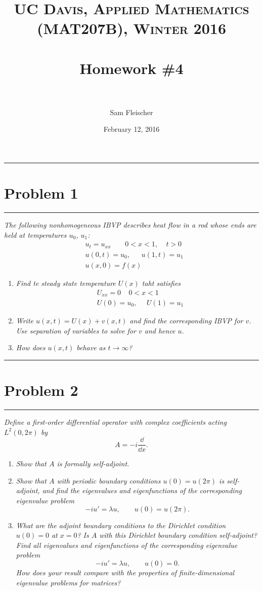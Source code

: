 \documentclass{article} %
\title{ 
\normalfont \normalsize 
\textsc{UC Davis, Applied Mathematics (MAT207B), Winter 2016} \\ [25pt] %
\horrule{2pt} \\[0.4cm] %
\Huge Homework \#4 \\ %
\horrule{2pt} \\[0.5cm] %
}
\author{\huge Sam Fleischer} %
\date{February 12, 2016} %
\theoremstyle{plain}
\newcommand{\problem}[1]{
\vspace{.375cm}
\begin{minipage}{\textwidth}
    \begin{center}
        \noindent\rule{5cm}{1pt}
    \end{center}
    \section{\bf #1}
    \begin{center}
        \noindent\rule{5cm}{1pt}
    \end{center}
    \vspace{0.25cm}
\end{minipage}
}
\numberwithin{equation}{section} %
\numberwithin{figure}{section} %
\numberwithin{table}{section} %
\begin{document}
\thispagestyle{empty}

\maketitle %

\makeatletter
{}
\makeatother

\pagebreak

\problem{Problem 1}
\emph{The following nonhomogeneous IBVP describes heat flow in a rod whose ends are held at temperatures $u_0$, $u_1$:}
\begin{align*}
    &u_t = u_{xx}\ \ \ \ \ \ \ \ \ 0 < x < 1,\ \ \ \ \ t > 0 \\
    &u(0, t) = u_0, \ \ \ \ \ \ \ u(1,t) = u_1 \\
    &u(x,0) = f(x)
\end{align*}
\begin{enumerate}[\bf (a)]  
    \item
        \emph{Find te steady state temperature $U(x)$ taht satisfies}
        \begin{align*}
            &U_{xx} = 0 \ \ \ \ \ 0 < x < 1 \\
            &U(0) = u_0,\ \ \ \ \ \ U(1) = u_1
        \end{align*}
    \item
        \emph{Write $u(x,t) = U(x) + v(x,t)$ and find the corresponding IBVP for $v$.  Use separation of variables to solve for $v$ and hence $u$.}
    \item
        \emph{How does $u(x,t)$ behave as $t \rightarrow \infty$?}
\end{enumerate}

\problem{Problem 2}
\emph{Define a first-order differential operator with complex coefficients acting $L^2(0, 2\pi)$ by $$A = -i \frac{\dd}{\dd x}.$$}
\begin{enumerate}[\bf (a)]
    \item
        \emph{Show that $A$ is formally self-adjoint.}
    \item
        \emph{Show that $A$ with periodic boundary conditions $u(0) = u(2\pi)$ is self-adjoint, and find the eigenvalues and eigenfunctions of the corresponding eigenvalue problem $$ -iu' = \lambda u, \qquad u(0) = u(2\pi).$$}
    \item
        \emph{What are the adjoint boundary conditions to the Dirichlet condition $u(0) = 0$ at $x = 0$?  Is $A$ with this Dirichlet boundary condition self-adjoint?  Find all eigenvalues and eigenfunctions of the corresponding eigenvalue problem $$ -iu' = \lambda u, \qquad u(0) = 0.$$  How does your result compare with the properties of finite-dimensional eigenvalue problems for matrices?}
\end{enumerate}
\end{document}
